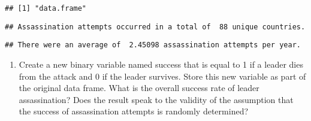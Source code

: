 \documentclass[
]{article}
\newenvironment{Shaded}{\begin{snugshade}}{\end{snugshade}}
\newcommand{\CharTok}[1]{\textcolor[rgb]{0.31,0.60,0.02}{#1}}
\newcommand{\KeywordTok}[1]{\textcolor[rgb]{0.13,0.29,0.53}{\textbf{#1}}}
\newcommand{\NormalTok}[1]{#1}
\newcommand{\OperatorTok}[1]{\textcolor[rgb]{0.81,0.36,0.00}{\textbf{#1}}}
\newcommand{\StringTok}[1]{\textcolor[rgb]{0.31,0.60,0.02}{#1}}
\providecommand{\tightlist}{%
  \setlength{\itemsep}{0pt}\setlength{\parskip}{0pt}}
\begin{document}
\begin{verbatim}
## [1] "data.frame"
\end{verbatim}

\begin{Shaded}
\end{Shaded}

\begin{verbatim}
## Assassination attempts occurred in a total of  88 unique countries.
\end{verbatim}

\begin{Shaded}
\end{Shaded}

\begin{verbatim}
## There were an average of  2.45098 assassination attempts per year.
\end{verbatim}

\begin{Shaded}
\end{Shaded}

\begin{enumerate}
\def\labelenumi{\arabic{enumi}.}
\setcounter{enumi}{1}
\tightlist
\item
  Create a new binary variable named success that is equal to 1 if a
  leader dies from the attack and 0 if the leader survives. Store this
  new variable as part of the original data frame. What is the overall
  success rate of leader assassination? Does the result speak to the
  validity of the assumption that the success of assassination attempts
  is randomly determined?
\end{enumerate}
\end{document}
